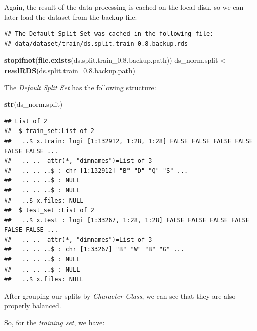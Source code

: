 \documentclass[
]{report}
\newenvironment{Shaded}{\begin{snugshade}}{\end{snugshade}}
\newcommand{\AttributeTok}[1]{\textcolor[rgb]{0.13,0.29,0.53}{#1}}
\newcommand{\FloatTok}[1]{\textcolor[rgb]{0.00,0.00,0.81}{#1}}
\newcommand{\FunctionTok}[1]{\textcolor[rgb]{0.13,0.29,0.53}{\textbf{#1}}}
\newcommand{\NormalTok}[1]{#1}
\newcommand{\OtherTok}[1]{\textcolor[rgb]{0.56,0.35,0.01}{#1}}
\newcommand{\SpecialCharTok}[1]{\textcolor[rgb]{0.81,0.36,0.00}{\textbf{#1}}}
\begin{document}
Again, the result of the data processing is cached on the local disk, so we can later load the dataset from the backup file:

\begin{verbatim}
## The Default Split Set was cached in the following file:
## data/dataset/train/ds.split.train_0.8.backup.rds
\end{verbatim}

\begin{Shaded}
\begin{Highlighting}[]
\FunctionTok{stopifnot}\NormalTok{(}\FunctionTok{file.exists}\NormalTok{(ds.split.train\_0.}\FloatTok{8.}\NormalTok{backup.path))}
\NormalTok{ds\_norm.split }\OtherTok{\textless{}{-}} \FunctionTok{readRDS}\NormalTok{(ds.split.train\_0.}\FloatTok{8.}\NormalTok{backup.path)}
\end{Highlighting}
\end{Shaded}

\newpage

The \emph{Default Split Set} has the following structure:

\begin{Shaded}
\begin{Highlighting}[]
\FunctionTok{str}\NormalTok{(ds\_norm.split)}
\end{Highlighting}
\end{Shaded}

\begin{verbatim}
## List of 2
##  $ train_set:List of 2
##   ..$ x.train: logi [1:132912, 1:28, 1:28] FALSE FALSE FALSE FALSE FALSE FALSE ...
##   .. ..- attr(*, "dimnames")=List of 3
##   .. .. ..$ : chr [1:132912] "B" "D" "Q" "S" ...
##   .. .. ..$ : NULL
##   .. .. ..$ : NULL
##   ..$ x.files: NULL
##  $ test_set :List of 2
##   ..$ x.test : logi [1:33267, 1:28, 1:28] FALSE FALSE FALSE FALSE FALSE FALSE ...
##   .. ..- attr(*, "dimnames")=List of 3
##   .. .. ..$ : chr [1:33267] "B" "W" "B" "G" ...
##   .. .. ..$ : NULL
##   .. .. ..$ : NULL
##   ..$ x.files: NULL
\end{verbatim}

After grouping our splits by \emph{Character Class}, we can see that they are also properly balanced.

\newpage

So, for the \emph{training set}, we have:

\begin{Shaded}
\end{Shaded}
\end{document}

